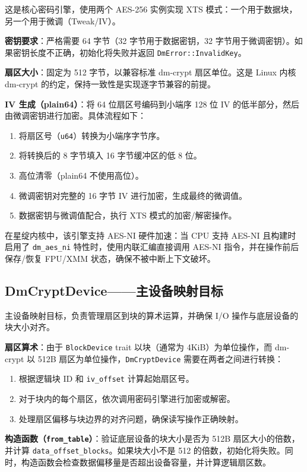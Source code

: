 这是核心密码引擎，使用两个 AES-256 实例实现 XTS 模式：一个用于数据块，另一个用于微调（Tweak/IV）。

\textbf{密钥要求}：严格需要 64 字节（32 字节用于数据密钥，32 字节用于微调密钥）。如果密钥长度不正确，初始化将失败并返回 \texttt{DmError::InvalidKey}。

\textbf{扇区大小}：固定为 512 字节，以兼容标准 dm-crypt 扇区单位。这是 Linux 内核 dm-crypt 的约定，保持一致性是实现逐字节兼容的前提。

\textbf{IV 生成（plain64）}：将 64 位扇区号编码到小端序 128 位 IV 的低半部分，然后由微调密钥进行加密。具体流程如下：
\begin{enumerate}
    \item 将扇区号（\texttt{u64}）转换为小端序字节序。
    \item 将转换后的 8 字节填入 16 字节缓冲区的低 8 位。
    \item 高位清零（plain64 不使用高位）。
    \item 微调密钥对完整的 16 字节 IV 进行加密，生成最终的微调值。
    \item 数据密钥与微调值配合，执行 XTS 模式的加密/解密操作。
\end{enumerate}

在星绽内核中，该引擎支持 AES-NI 硬件加速：当 CPU 支持 AES-NI 且构建时启用了 \texttt{dm\_aes\_ni} 特性时，使用内联汇编直接调用 AES-NI 指令，并在操作前后保存/恢复 FPU/XMM 状态，确保不被中断上下文破坏。

\subsection{DmCryptDevice——主设备映射目标}

主设备映射目标，负责管理扇区到块的算术运算，并确保 I/O 操作与底层设备的块大小对齐。

\textbf{扇区算术}：由于 \texttt{BlockDevice} trait 以块（通常为 4KiB）为单位操作，而 dm-crypt 以 512B 扇区为单位操作，\texttt{DmCryptDevice} 需要在两者之间进行转换：
\begin{enumerate}
    \item 根据逻辑块 ID 和 \texttt{iv\_offset} 计算起始扇区号。
    \item 对于块内的每个扇区，依次调用密码引擎进行加密或解密。
    \item 处理扇区偏移与块边界的对齐问题，确保读写操作正确映射。
\end{enumerate}

\textbf{构造函数（\texttt{from\_table}）}：验证底层设备的块大小是否为 512B 扇区大小的倍数，并计算 \texttt{data\_offset\_blocks}。如果块大小不是 512 的倍数，初始化将失败。同时，构造函数会检查数据偏移量是否超出设备容量，并计算逻辑扇区数。

